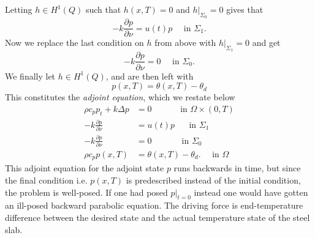 Letting $h\in H^1(Q)$ such that $h(x, T) = 0$ and $h|_{\Sigma_0}=0$ gives that
\begin{equation*}
  -k\frac{\partial p}{\partial\nu} = u(t)p \quad\textrm{ in } \Sigma_1.
\end{equation*}
Now we replace the last condition on $h$ from above with $h|_{\Sigma_1}=0$ and get
\begin{equation*}
  -k\frac{\partial p}{\partial\nu} = 0 \quad\textrm{ in } \Sigma_0.
\end{equation*}
We finally let $h\in H^1(Q)$, and are then left with
\begin{equation*}
  p(x, T) = \theta(x, T) - \theta_d
\end{equation*}
This constitutes the \textit{adjoint equation}, which we restate below
\begin{subequations}\label{eq:adjoint-system}
   \begin{align} %
      \rho c_p p_t + k\Delta p &= 0 \quad\qquad\textrm{ in } \Omega \times (0,T) \label{eq:adjoint-system-eqn} \\
      {-k}\frac{\partial p}{\partial\nu} &= u(t)p \,\,\quad\textrm{ in } \Sigma_1 \label{eq:adjoint-system-bd-1} \\
      {-k}\frac{\partial p}{\partial\nu} &= 0 \,\quad\qquad\textrm{ in } \Sigma_0 \label{eq:adjoint-system-bd-2} \\
      \rho c_p p(x, T) &= \theta(x, T) - \theta_d. \quad \textrm{ in } \Omega
   \end{align}
   \label{eq:adjoint-eqn}
\end{subequations}
This adjoint equation for the adjoint state $p$ runs backwards in time, but since the final condition i.e. $p(x,T)$ is predescribed instead of the initial condition, the problem is well-posed. If one had posed $p|_{t=0}$ instead one would have gotten an ill-posed backward parabolic equation. The driving force is end-temperature difference between the desired state and the actual temperature state of the steel slab.

